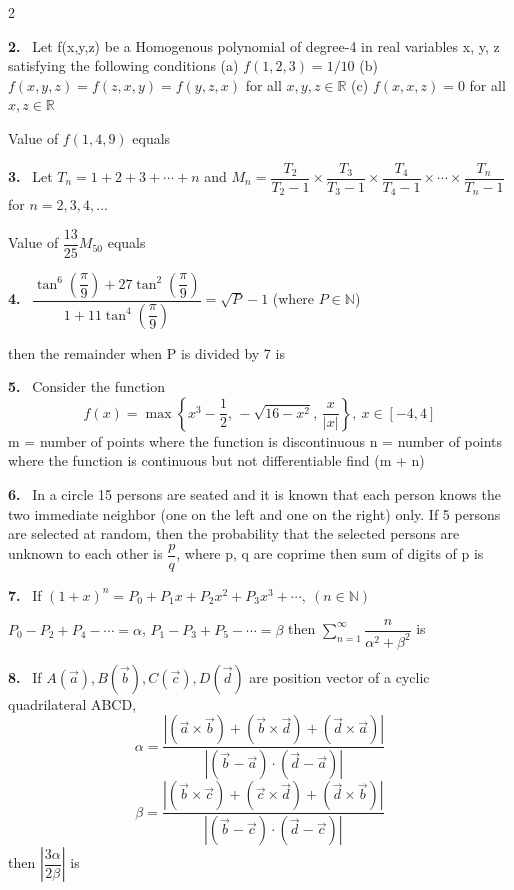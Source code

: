 \documentclass[10pt]{extarticle}
\newcommand{\qn}[1]{\par\smallskip\noindent\textbf{#1.}~}
\begin{document}
\begin{multicols}{2}
\qn{2} Let f(x,y,z) be a Homogenous polynomial of degree-4 in real variables x, y, z satisfying the following conditions
(a) $f(1,2,3)=1/10$
(b) $f(x,y,z)=f(z,x,y)=f(y,z,x)$ for all $x,y,z\in\mathbb{R}$
(c) $f(x,x,z)=0$ for all $x,z\in\mathbb{R}$

Value of $f(1,4,9)$ equals

\qn{3} Let $T_n = 1+2+3+\cdots+n$ and $M_n = \dfrac{T_2}{T_2-1}\times\dfrac{T_3}{T_3-1}\times\dfrac{T_4}{T_4-1}\times\cdots\times\dfrac{T_n}{T_n-1}$ for $n=2,3,4,\ldots$

Value of $\dfrac{13}{25}M_{50}$ equals

\qn{4} $\dfrac{\tan^6\left(\dfrac{\pi}{9}\right)+27\tan^2\left(\dfrac{\pi}{9}\right)}{1+11\tan^4\left(\dfrac{\pi}{9}\right)} = \sqrt{P}-1$ (where $P\in\mathbb{N}$)

then the remainder when P is divided by 7 is\underline{\hspace{1.5cm}}

\qn{5} Consider the function
\[f(x)=\max\left\{x^3-\dfrac12,\,-\sqrt{16-x^2},\,\dfrac{x}{|x|}\right\},\ x\in[-4,4]\]
m = number of points where the function is discontinuous
n = number of points where the function is continuous but not differentiable
find (m + n)

\qn{6} In a circle 15 persons are seated and it is known that each person knows the two immediate neighbor (one on the left and one on the right) only. If 5 persons are selected at random, then the probability that the selected persons are unknown to each other is $\dfrac{p}{q}$, where p, q are coprime then sum of digits of p is\underline{\hspace{1.5cm}}

\qn{7} If $(1+x)^n = P_0+P_1x+P_2x^2+P_3x^3+\cdots,\ (n\in\mathbb{N})$

$P_0-P_2+P_4-\cdots=\alpha$, $P_1-P_3+P_5-\cdots=\beta$ then $\displaystyle\sum_{n=1}^{\infty}\dfrac{n}{\alpha^2+\beta^2}$ is

\qn{8} If $A(\vec a), B(\vec b), C(\vec c), D(\vec d)$ are position vector of a cyclic quadrilateral ABCD,
\[\alpha=\dfrac{\left|(\vec a\times\vec b)+(\vec b\times\vec d)+(\vec d\times\vec a)\right|}{\left|(\vec b-\vec a)\cdot(\vec d-\vec a)\right|}\]
\[\beta=\dfrac{\left|(\vec b\times\vec c)+(\vec c\times\vec d)+(\vec d\times\vec b)\right|}{\left|(\vec b-\vec c)\cdot(\vec d-\vec c)\right|}\]
then $\left|\dfrac{3\alpha}{2\beta}\right|$ is

\end{multicols}
\end{document}
